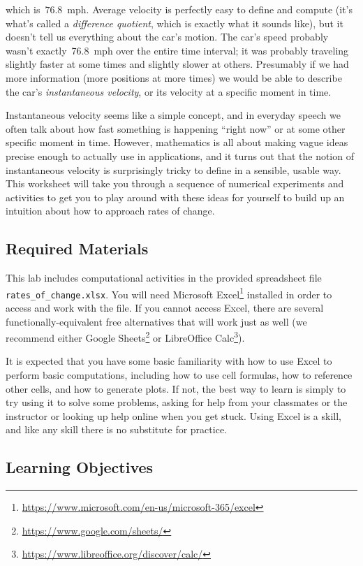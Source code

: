 which is~$76.8$~mph. Average velocity is perfectly easy to define and compute (it's what's called a \textit{difference quotient}, which is exactly what it sounds like), but it doesn't tell us everything about the car's motion. The car's speed probably wasn't exactly~76.8~mph over the entire time interval; it was probably traveling slightly faster at some times and slightly slower at others. Presumably if we had more information (more positions at more times) we would be able to describe the car's \textit{instantaneous velocity}, or its velocity at a specific moment in time.

Instantaneous velocity seems like a simple concept, and in everyday speech we often talk about how fast something is happening ``right now'' or at some other specific moment in time. However, mathematics is all about making vague ideas precise enough to actually use in applications, and it turns out that the notion of instantaneous velocity is surprisingly tricky to define in a sensible, usable way. This worksheet will take you through a sequence of numerical experiments and activities to get you to play around with these ideas for yourself to build up an intuition about how to approach rates of change.

\subsection*{Required Materials}

This lab includes computational activities in the provided spreadsheet file \verb|rates_of_change.xlsx|. You will need Microsoft Excel\footnote{\url{https://www.microsoft.com/en-us/microsoft-365/excel}} installed in order to access and work with the file. If you cannot access Excel, there are several functionally-equivalent free alternatives that will work just as well (we recommend either Google Sheets\footnote{\url{https://www.google.com/sheets/}} or LibreOffice Calc\footnote{\url{https://www.libreoffice.org/discover/calc/}}).

It is expected that you have some basic familiarity with how to use Excel to perform basic computations, including how to use cell formulas, how to reference other cells, and how to generate plots. If not, the best way to learn is simply to try using it to solve some problems, asking for help from your classmates or the instructor or looking up help online when you get stuck. Using Excel is a skill, and like any skill there is no substitute for practice.

\subsection*{Learning Objectives}

